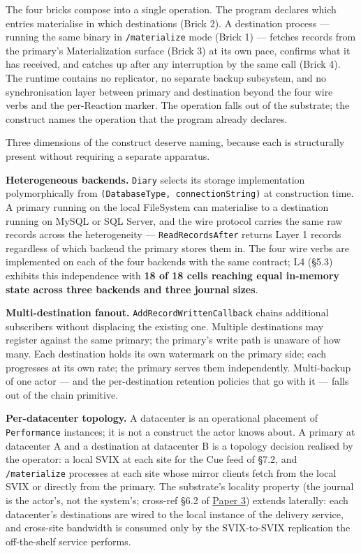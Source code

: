 \documentclass[
]{article}
\begin{document}
The four bricks compose into a single operation. The program declares
which entries materialise in which destinations (Brick 2). A destination
process --- running the same binary in \texttt{/materialize} mode (Brick
1) --- fetches records from the primary's Materialization surface (Brick
3) at its own pace, confirms what it has received, and catches up after
any interruption by the same call (Brick 4). The runtime contains no
replicator, no separate backup subsystem, and no synchronisation layer
between primary and destination beyond the four wire verbs and the
per-Reaction marker. The operation falls out of the substrate; the
construct names the operation that the program already declares.

Three dimensions of the construct deserve naming, because each is
structurally present without requiring a separate apparatus.

\textbf{Heterogeneous backends.} \texttt{Diary} selects its storage
implementation polymorphically from
\texttt{(DatabaseType,\ connectionString)} at construction time. A
primary running on the local FileSystem can materialise to a destination
running on MySQL or SQL Server, and the wire protocol carries the same
raw records across the heterogeneity --- \texttt{ReadRecordsAfter}
returns Layer 1 records regardless of which backend the primary stores
them in. The four wire verbs are implemented on each of the four
backends with the same contract; L4 (§5.3) exhibits this independence
with \textbf{18 of 18 cells reaching equal in-memory state across three
backends and three journal sizes}.

\textbf{Multi-destination fanout.} \texttt{AddRecordWrittenCallback}
chains additional subscribers without displacing the existing one.
Multiple destinations may register against the same primary; the
primary's write path is unaware of how many. Each destination holds its
own watermark on the primary side; each progresses at its own rate; the
primary serves them independently. Multi-backup of one actor --- and the
per-destination retention policies that go with it --- falls out of the
chain primitive.

\textbf{Per-datacenter topology.} A datacenter is an operational
placement of \texttt{Performance} instances; it is not a construct the
actor knows about. A primary at datacenter A and a destination at
datacenter B is a topology decision realised by the operator: a local
SVIX at each site for the Cue feed of §7.2, and \texttt{/materialize}
processes at each site whose mirror clients fetch from the local SVIX or
directly from the primary. The substrate's locality property (the
journal is the actor's, not the system's; cross-ref §6.2 of
\href{03-reactions-and-partition.md}{Paper 3}) extends laterally: each
datacenter's destinations are wired to the local instance of the
delivery service, and cross-site bandwidth is consumed only by the
SVIX-to-SVIX replication the off-the-shelf service performs.
\end{document}
